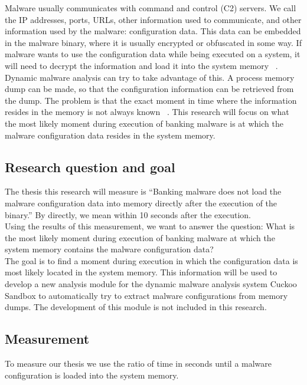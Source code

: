 \documentclass[conference]{IEEEtran}
\begin{document}
Malware usually communicates with command and control (C2) servers. We call the IP addresses, ports, URLs, other information used to communicate, and other information used by the malware: configuration data. This data can be embedded in the malware binary, where it is usually encrypted or obfuscated in some way. If malware wants to use the configuration data while being executed on a system, it will need to decrypt the information and load it into the system memory ~\cite{wykeconfextract}.\\

Dynamic malware analysis can try to take advantage of this. A process memory dump can be made, so that the configuration information can be retrieved from the dump. The problem is that the exact moment in time where the information resides in the memory is not always known ~\cite{wykeconfextract}. This research will focus on what the most likely moment during execution of banking malware is at which the malware configuration data resides in the system memory. 


\subsection{Research question and goal}
The thesis this research will measure is “Banking malware does not load the malware configuration data into memory directly after the execution of the binary.” By directly, we mean within 10 seconds after the execution.\\

Using the results of this measurement, we want to answer the question: What is the most likely moment during execution of banking malware at which the system memory contains the malware configuration data?\\

The goal is to find a moment during execution in which the configuration data is most likely located in the system memory. This information will be used to develop a new analysis module for the dynamic malware analysis system Cuckoo Sandbox to automatically try to extract malware configurations from memory dumps. The development of this module is not included in this research.


\subsection{Measurement}
To measure our thesis we use the ratio of time in seconds until a malware configuration is loaded into the system memory.
\end{document}
